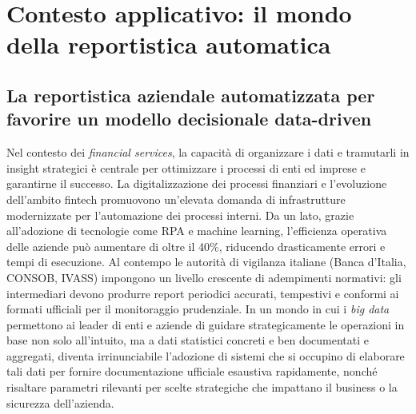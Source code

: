 \chapter{Contesto applicativo: il mondo della reportistica automatica}
\section{La reportistica aziendale automatizzata per favorire un modello decisionale data-driven}
Nel contesto dei \emph{financial services}, la capacità di organizzare i dati e tramutarli in insight strategici è centrale per ottimizzare i processi di enti ed imprese e garantirne il successo.
La digitalizzazione dei processi finanziari e l'evoluzione dell'ambito fintech promuovono un'elevata domanda di infrastrutture modernizzate per l'automazione dei processi interni. Da un lato, grazie all’adozione di tecnologie come RPA e machine learning, l’efficienza operativa delle aziende può aumentare di oltre il 40\%, riducendo drasticamente errori e tempi di esecuzione. Al contempo le autorità di vigilanza italiane (Banca d’Italia, CONSOB, IVASS) impongono un livello crescente di adempimenti normativi: gli intermediari devono produrre report periodici accurati, tempestivi e conformi ai formati ufficiali per il monitoraggio prudenziale.
In un mondo in cui i \emph{big data} permettono ai leader di enti e aziende di guidare strategicamente le operazioni in base non solo all'intuito, ma a dati statistici concreti e ben documentati e aggregati, diventa irrinunciabile l'adozione di sistemi che si occupino di elaborare tali dati per fornire documentazione ufficiale esaustiva rapidamente, nonché risaltare parametri rilevanti per scelte strategiche che impattano il business o la sicurezza dell'azienda.

